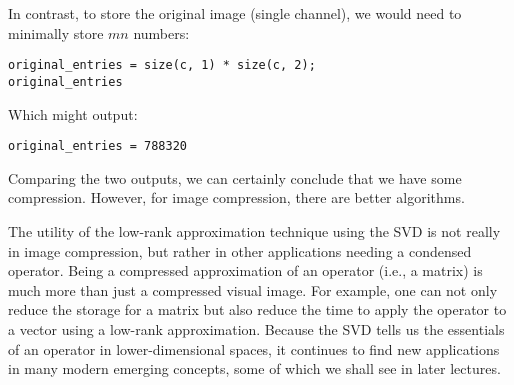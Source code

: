 \documentclass{ximera}
\begin{document}
In contrast, to store the original image (single channel), we would need to minimally store \( mn \) numbers:

\begin{verbatim}
original_entries = size(c, 1) * size(c, 2);
original_entries
\end{verbatim}

Which might output:

\begin{verbatim}
original_entries = 788320
\end{verbatim}

Comparing the two outputs, we can certainly conclude that we have some compression. However, for image compression, there are better algorithms.

The utility of the low-rank approximation technique using the SVD is not really in image compression, but rather in other applications needing a condensed operator. Being a compressed approximation of an operator (i.e., a matrix) is much more than just a compressed visual image. For example, one can not only reduce the storage for a matrix but also reduce the time to apply the operator to a vector using a low-rank approximation. Because the SVD tells us the essentials of an operator in lower-dimensional spaces, it continues to find new applications in many modern emerging concepts, some of which we shall see in later lectures.
 
\end{document}
